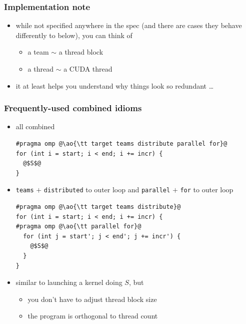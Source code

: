 \documentclass[12pt,dvipdfmx]{beamer}
\newcommand{\ao}[1]{{\color{blue}#1}}
\begin{document}
\begin{frame}
  \frametitle{Implementation note}
  \begin{itemize}
  \item while not specified anywhere in the spec (and there are cases
    they behave differently to below), you can think of
    \begin{itemize}
    \item \ao{a team $\sim$ a thread block}
    \item \ao{a thread $\sim$ a CUDA thread}
    \end{itemize}
  \item it at least helps you understand why things look so redundant \ldots
  \end{itemize}
\end{frame}

\begin{frame}[fragile]
  \frametitle{Frequently-used combined idioms}
  \begin{itemize}
  \item all combined
\begin{lstlisting}
#pragma omp @\ao{\tt target teams distribute parallel for}@
for (int i = start; i < end; i += incr) {
  @$S$@
}  
\end{lstlisting}
\item {\tt teams} $+$ {\tt distributed} to outer loop
  and {\tt parallel} $+$ {\tt for} to outer loop
\begin{lstlisting}
#pragma omp @\ao{\tt target teams distribute}@
for (int i = start; i < end; i += incr) {
#pragma omp @\ao{\tt parallel for}@
  for (int j = start'; j < end'; j += incr') {
    @$S$@
  }
}  
\end{lstlisting}
\item similar to launching a kernel doing $S$, but
  \begin{itemize}
  \item you don't have to adjust thread block size
  \item the program is orthogonal to thread count
  \end{itemize}
\end{itemize}
\end{frame}
\end{document}
